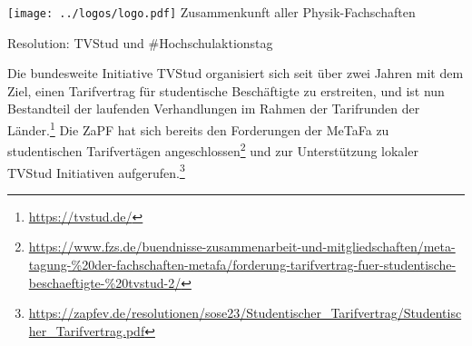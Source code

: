 \documentclass[DIV=calc]{scrartcl}
\begin{document}
\hspace{0.87\textwidth}
\begin{minipage}{120pt}
	\vspace{-1.8cm}
	\texttt{[image: ../logos/logo.pdf]}
	\centering
	\small Zusammenkunft aller Physik-Fachschaften
\end{minipage}

\begin{center}
  \huge{Resolution: TVStud und \#Hochschulaktionstag}\vspace{.25\baselineskip}\\
  \normalsize
\end{center}
\vspace{1cm}







Die bundesweite Initiative TVStud organisiert sich seit über zwei Jahren mit dem Ziel, einen Tarifvertrag für studentische Beschäftigte zu erstreiten, und ist nun Bestandteil der laufenden Verhandlungen im Rahmen der Tarifrunden der Länder.\footnote{\url{https://tvstud.de/}} Die ZaPF hat sich bereits den Forderungen der MeTaFa zu studentischen Tarifvertägen angeschlossen\footnote{\url{https://www.fzs.de/buendnisse-zusammenarbeit-und-mitgliedschaften/meta-tagung-\%20der-fachschaften-metafa/forderung-tarifvertrag-fuer-studentische-beschaeftigte-\%20tvstud-2/}} und zur Unterstützung lokaler TVStud Initiativen aufgerufen.\footnote{\url{https://zapfev.de/resolutionen/sose23/Studentischer_Tarifvertrag/Studentischer_Tarifvertrag.pdf}}
\end{document}

